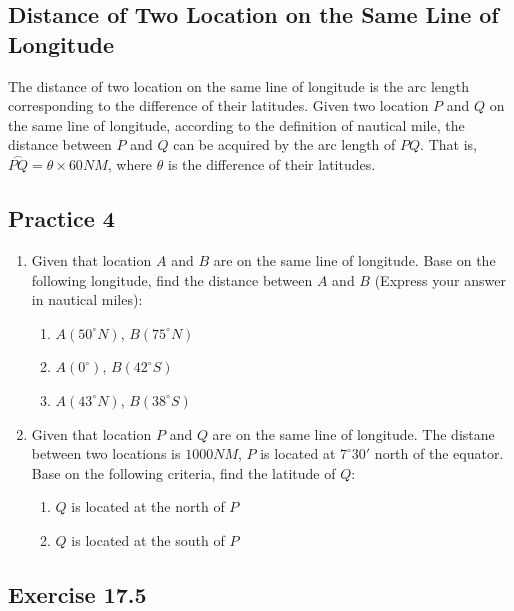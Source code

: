 \documentclass{report}
\begin{document}
\begin{multicols*}{2}
    \section{Distance of Two Location on the Same Line of Longitude}

    The distance of two location on the same line of longitude is the arc length
    corresponding to the difference of their latitudes. Given two location $P$ and
    $Q$ on the same line of longitude, according to the definition of nautical
    mile, the distance between $P$ and $Q$ can be acquired by the arc length of
    $PQ$. That is, $\overset{\frown}{PQ} = \theta \times 60NM$, where $\theta$ is
    the difference of their latitudes.

    \subsection{Practice 4}

    \begin{enumerate}
        \item Given that location $A$ and $B$ are on the same line of longitude. Base on the
              following longitude, find the distance between $A$ and $B$ (Express your answer
              in nautical miles):
              \begin{enumerate}
                  \item $A(50^\circ N)$, $B(75^\circ N)$
                  \item $A(0^\circ)$, $B(42^\circ S)$
                  \item $A(43^\circ N)$, $B(38^\circ S)$
              \end{enumerate}
        \item Given that location $P$ and $Q$ are on the same line of longitude. The distane
              between two locations is $1000NM$, $P$ is located at $7^\circ 30'$ north of the
              equator. Base on the following criteria, find the latitude of $Q$:
              \begin{enumerate}
                  \item $Q$ is located at the north of $P$
                  \item $Q$ is located at the south of $P$
              \end{enumerate}
    \end{enumerate}

    \subsection {Exercise 17.5}


\end{multicols*}
\end{document}
